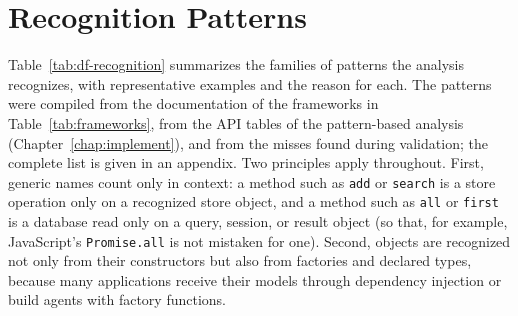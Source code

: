 \section{Recognition Patterns}
\label{sec:df-recognition}

Table~\ref{tab:df-recognition} summarizes the families of patterns the analysis recognizes, with representative examples and the reason for each. The patterns were compiled from the documentation of the frameworks in Table~\ref{tab:frameworks}, from the API tables of the pattern-based analysis (Chapter~\ref{chap:implement}), and from the misses found during validation; the complete list is given in an appendix. Two principles apply throughout. First, generic names count only in context: a method such as \texttt{add} or \texttt{search} is a store operation only on a recognized store object, and a method such as \texttt{all} or \texttt{first} is a database read only on a query, session, or result object (so that, for example, JavaScript's \texttt{Promise.all} is not mistaken for one). Second, objects are recognized not only from their constructors but also from factories and declared types, because many applications receive their models through dependency injection or build agents with factory functions.

